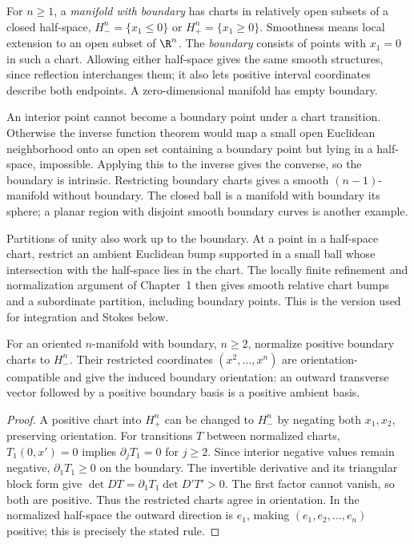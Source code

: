 \begin{definition}
For $n\ge1$, a \emph{manifold with boundary} has charts in relatively open subsets of a closed half-space, $H_-^n=\{x_1\le0\}$ or $H_+^n=\{x_1\ge0\}$. Smoothness means local extension to an open subset of $\R^n$. The \emph{boundary} consists of points with $x_1=0$ in such a chart. Allowing either half-space gives the same smooth structures, since reflection interchanges them; it also lets positive interval coordinates describe both endpoints. A zero-dimensional manifold has empty boundary.
\end{definition}

An interior point cannot become a boundary point under a chart transition. Otherwise the inverse function theorem would map a small open Euclidean neighborhood onto an open set containing a boundary point but lying in a half-space, impossible. Applying this to the inverse gives the converse, so the boundary is intrinsic. Restricting boundary charts gives a smooth $(n-1)$-manifold without boundary. The closed ball is a manifold with boundary its sphere; a planar region with disjoint smooth boundary curves is another example.

Partitions of unity also work up to the boundary. At a point in a half-space chart, restrict an ambient Euclidean bump supported in a small ball whose intersection with the half-space lies in the chart. The locally finite refinement and normalization argument of Chapter~1 then gives smooth relative chart bumps and a subordinate partition, including boundary points. This is the version used for integration and Stokes below.

\begin{proposition}\label{prop:bdryorient}
For an oriented $n$-manifold with boundary, $n\ge2$, normalize positive boundary charts to $H_-^n$. Their restricted coordinates $(x^2,\ldots,x^n)$ are orientation-compatible and give the induced boundary orientation: an outward transverse vector followed by a positive boundary basis is a positive ambient basis.
\end{proposition}

\begin{proof}
A positive chart into $H_+^n$ can be changed to $H_-^n$ by negating both $x_1,x_2$, preserving orientation. For transitions $T$ between normalized charts, $T_1(0,x')=0$ implies $\partial_jT_1=0$ for $j\ge2$. Since interior negative values remain negative, $\partial_1T_1\ge0$ on the boundary. The invertible derivative and its triangular block form give
$\det DT=\partial_1T_1\det D'T'>0$. The first factor cannot vanish, so both are positive. Thus the restricted charts agree in orientation. In the normalized half-space the outward direction is $e_1$, making $(e_1,e_2,\ldots,e_n)$ positive; this is precisely the stated rule.
\end{proof}

